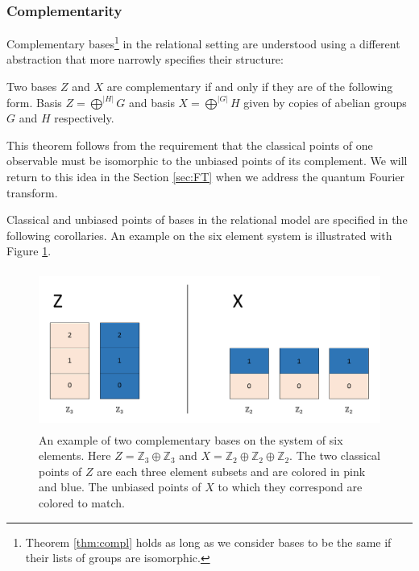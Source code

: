 \subsubsection*{Complementarity}
Complementary bases\footnote{Theorem \ref{thm:compl} holds as long as we consider bases to be the same if their lists of groups are isomorphic.} in the relational setting are understood using a different abstraction that more narrowly specifies their structure:
\begin{theorem}
\label{thm:compl}
Two bases $Z$ and $X$ are complementary if and only if they are of the following form. Basis $Z = \bigoplus^{|H|}G$ and basis $X = \bigoplus^{|G|}H$ given by copies of abelian groups $G$ and $H$ respectively.
\end{theorem}

This theorem follows from the requirement that the classical points of one observable must be isomorphic to the unbiased points of its complement. We will return to this idea in the Section \ref{sec:FT} when we address the quantum Fourier transform.

Classical and unbiased points of bases in the relational model are specified in the following corollaries. An example on the six element system is illustrated with Figure \ref{complEx}.

\begin{figure}[tb]
\begin{center}
\includegraphics[height=14em,natwidth=1091,natheight=468,scale=1]{images/complexample.png}
\end{center}
\caption{An example of two complementary bases on the system of six elements. Here $Z=\mathbb{Z}_3\oplus\mathbb{Z}_3$ and $X = \mathbb{Z}_2\oplus\mathbb{Z}_2\oplus \mathbb{Z}_2$.  The two classical points of $Z$ are each three element subsets and are colored in pink and blue. The unbiased points of $X$ to which they correspond are colored to match.
}
\label{complEx}
\end{figure}

